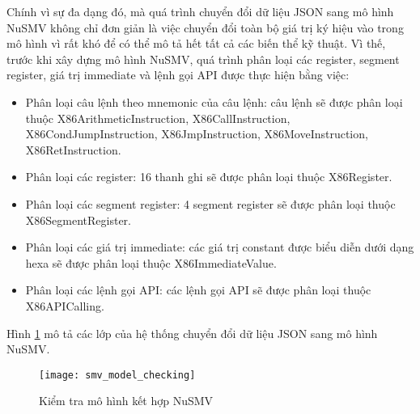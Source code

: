 \hspace{0.5cm}Chính vì sự đa dạng đó, mà quá trình chuyển đổi dữ liệu JSON sang mô hình NuSMV không chỉ đơn giản là việc chuyển đổi toàn bộ giá trị ký hiệu vào trong mô hình vì rất khó để có thể mô tả hết tất cả các biến thể kỹ thuật. Vì thế, trước khi xây dựng mô hình NuSMV, quá trình phân loại các register, segment register, giá trị immediate và lệnh gọi API được thực hiện bằng việc:

\begin{itemize}
\item{Phân loại câu lệnh theo mnemonic của câu lệnh: câu lệnh sẽ được phân loại thuộc X86ArithmeticInstruction, X86CallInstruction, X86CondJumpInstruction, X86JmpInstruction, X86MoveInstruction, X86RetInstruction.}
\item{Phân loại các register: 16 thanh ghi sẽ được phân loại thuộc X86Register.}
\item{Phân loại các segment register: 4 segment register sẽ được phân loại thuộc X86SegmentRegister.}
\item{Phân loại các giá trị immediate: các giá trị constant được biểu diễn dưới dạng hexa sẽ được phân loại thuộc X86ImmediateValue.}
\item{Phân loại các lệnh gọi API: các lệnh gọi API sẽ được phân loại thuộc X86APICalling.}
\end{itemize}

\hspace{0.5cm}Hình \ref {fig:SMVModelChecking} mô tả các lớp của hệ thống chuyển đổi dữ liệu JSON sang mô hình NuSMV.

\begin{figure}
\centering
\texttt{[image: smv\_model\_checking]}
\caption{Kiểm tra mô hình kết hợp NuSMV}
\label{fig:SMVModelChecking}
\end{figure}


